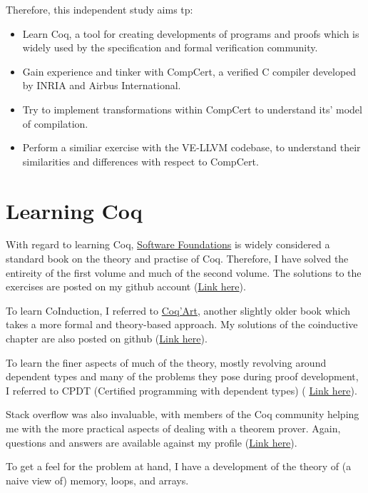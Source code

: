 \documentclass{article}
\begin{document}
Therefore, this independent study aims tp:
\begin{itemize}
	\item Learn Coq, a tool for creating developments of programs and proofs which is widely used by the 
	specification and formal verification community.
	\item Gain experience and tinker with CompCert, a verified C compiler developed by INRIA and Airbus International.
	\item Try to implement transformations within CompCert to understand its' model of compilation.
	\item Perform a similiar exercise with the VE-LLVM codebase, to understand their similarities and differences with respect to CompCert.
\end{itemize}



\section{Learning Coq}
With regard to learning Coq, \href{https://softwarefoundations.cis.upenn.edu/}{Software Foundations} is widely considered a standard book
on the theory and practise of Coq. Therefore, I have solved the entireity of the first volume and much of the second volume.
The solutions to the exercises are posted on my github account (\href{https://github.com/bollu/software-foundations-solutions}{Link here}).


To learn CoInduction, I referred to \href{https://www.labri.fr/perso/casteran/CoqArt/}{Coq'Art}, another slightly older book 
which takes a more formal and theory-based approach. My solutions of the coinductive chapter are also posted on github 
(\href{https://github.com/bollu/dependence-analysis-coq/tree/master/coinduction}{Link here}).

To learn the finer aspects of much of the theory, mostly revolving around dependent types and many of the problems
they pose during proof development, I referred to CPDT (Certified programming with dependent types) (
\href{http://adam.chlipala.net/cpdt/cpdt.pdf}{Link here}).


Stack overflow was also invaluable, with members of the Coq community helping me with the more practical
aspects of dealing with a theorem prover. Again, questions and answers are available against my profile 
(\href{https://stackoverflow.com/users/5305365/siddharth-bhat}{Link here}).


To get a feel for the problem at hand, I have a development of the theory of (a naive view of) memory, loops, and
arrays. 
\end{document}
